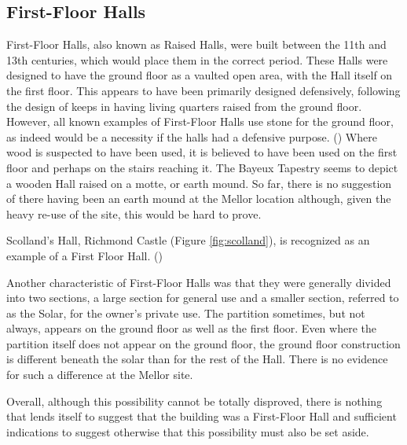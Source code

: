 \documentclass[letterpaper,11pt,titlepage]{article}
\begin{document}
{\subsection{First-Floor Halls}
First-Floor Halls, also known as Raised Halls, were built between the 11th and 13th centuries, which would place them in the correct period. These Halls were designed to have the ground floor as a vaulted open area, with the Hall itself on the first floor. This appears to have been primarily designed defensively, following the design of keeps in having living quarters raised from the ground floor. However, all known examples of First-Floor Halls use stone for the ground floor, as indeed would be a necessity if the halls had a defensive purpose. () Where wood is suspected to have been used, it is believed to have been used on the first floor and perhaps on the stairs reaching it. The Bayeux Tapestry seems to depict a wooden Hall raised on a motte, or earth mound. So far, there is no suggestion of there having been an earth mound at the Mellor location although, given the heavy re-use of the site, this would be hard to prove. 

Scolland's Hall, Richmond Castle (Figure \ref{fig:scolland}), is recognized as an example of a First Floor Hall. ()

Another characteristic of First-Floor Halls was that they were generally divided into two sections, a large section for general use and a smaller section, referred to as the Solar, for the owner's private use. The partition sometimes, but not always, appears on the ground floor as well as the first floor. Even where the partition itself does not appear on the ground floor, the ground floor construction is different beneath the solar than for the rest of the Hall. There is no evidence for such a difference at the Mellor site.

Overall, although this possibility cannot be totally disproved, there is nothing that lends itself to suggest that the building was a First-Floor Hall and sufficient indications to suggest otherwise that this possibility must also be set aside.

}
\end{document}
